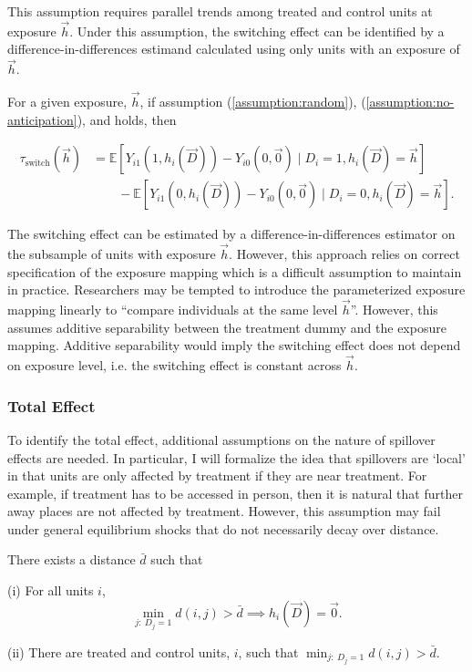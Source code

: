 \documentclass[11pt]{article}
\begin{document}
This assumption requires parallel trends among treated and control units at exposure $\vec{h}$. Under this assumption, the switching effect can be identified by a difference-in-differences estimand calculated using only units with an exposure of $\vec{h}$.

\begin{proposition}
    For a given exposure, $\vec{h}$, if assumption (\ref{assumption:random}), (\ref{assumption:no-anticipation}), and  holds, then 

    \begin{align*}
        \tau_{\text{switch}}(\vec{h}) &= \mathbb{E} \left[ Y_{i1}(1, h_i(\vec{D})) - Y_{i0}(0,\vec{0}) \mid D_i = 1, h_i(\vec{D}) = \vec{h} \right] \\ 
        &\quad\quad - \mathbb{E} \left[ Y_{i1}(0, h_i(\vec{D})) - Y_{i0}(0,\vec{0}) \mid D_i = 0, h_i(\vec{D}) = \vec{h} \right].
    \end{align*}
\end{proposition}

The switching effect can be estimated by a difference-in-differences estimator on the subsample of units with exposure $\vec{h}$. However, this approach relies on correct specification of the exposure mapping which is a difficult assumption to maintain in practice. Researchers may be tempted to introduce the parameterized exposure mapping linearly to ``compare individuals at the same level $\vec{h}$''. However, this assumes additive separability between the treatment dummy and the exposure mapping. Additive separability would imply the switching effect does not depend on exposure level, i.e. the switching effect is constant across $\vec{h}$.

\subsubsection{Total Effect}

To identify the total effect, additional assumptions on the nature of spillover effects are needed. In particular, I will formalize the idea that spillovers are `local' in that units are only affected by treatment if they are near treatment. For example, if treatment has to be accessed in person, then it is natural that further away places are not affected by treatment. However, this assumption may fail under general equilibrium shocks that do not necessarily decay over distance.

\begin{assumption}\label{assumption:local}
    There exists a distance $\bar{d}$ such that 
    
    (i) For all units $i$,
    \[ 
        \min_{j: \ D_j = 1} d(i,j) > \bar{d} \implies h_i(\vec{D}) = \vec{0}. 
    \]

    (ii) There are treated and control units, $i$, such that $\min_{j: \ D_j = 1} d(i,j) > \bar{d}$.
\end{assumption}
\end{document}
